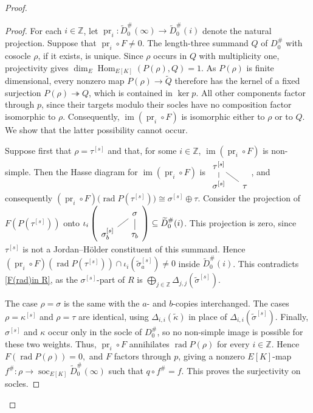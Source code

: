 \documentclass[a4paper,10pt,twoside]{amsart}
\theoremstyle{definition}
\numberwithin{equation}{section}
\begin{document}
\begin{proof}
\begin{proof}
For each \(i\in\mathbb Z\), let
\(
\operatorname{pr}_i:
\widetilde D_0^\#(\infty)\rightarrow
\widetilde D_0^\#(i)
\)
denote the natural projection. Suppose that
\(\operatorname{pr}_i\circ F\neq0\).
The length-three summand \(Q\) of \(D_0^\#\) with cosocle
\(\rho\), if it exists, is unique. Since \(\rho\) occurs
in \(Q\) with multiplicity one, projectivity gives
\(\dim_E\operatorname{Hom}_{E[K]}(P(\rho),Q)=1\).
As \(P(\rho)\) is finite dimensional, every nonzero map
\(P(\rho)\to\widetilde Q\) therefore has the kernel of a
fixed surjection \(P(\rho)\twoheadrightarrow Q\), which
is contained in \(\ker p\). All other components factor
through \(p\), since their targets modulo their socles
have no composition factor isomorphic to \(\rho\).
Consequently, \(\operatorname{im}(\operatorname{pr}_i\circ F)\)
is isomorphic either to \(\rho\) or to \(Q\).
We show that the latter possibility cannot occur.

Suppose first that \(\rho=\tau^{[s]}\) and that, for some \(i\in\mathbb Z\),
\(\operatorname{im}(\operatorname{pr}_i\circ F)\) is non-simple.
Then the Hasse diagram for $\operatorname{im}(\operatorname{pr}_i\circ F)$ is $\begin{tikzcd}[row sep=0.7em,column sep=1.2em]\tau^{[s]} & \\
\sigma^{[s]} & \tau
\arrow[no head, from=1-1, to=2-1]
\arrow[no head, from=1-1, to=2-2]
\end{tikzcd}$, and consequently $(\operatorname{pr}_i\circ F)
\bigl(\operatorname{rad}P(\tau^{[s]})\bigr)
\cong
\sigma^{[s]}\oplus\tau$. Consider the projection of \(F(P(\tau^{[s]}))\) onto $\iota_i\left(\begin{tikzcd}[row sep=0.7em,column sep=1.2em]
& \sigma \\
\sigma^{[s]}_b & \tau_b
\arrow[no head, from=1-2, to=2-1]
\arrow[no head, from=1-2, to=2-2]
\end{tikzcd}\right)\subseteq \widetilde D_0^\#(i)$. This projection is zero, since
\(\tau^{[s]}\) is not a Jordan--Hölder constituent of this summand. Hence $(\operatorname{pr}_i\circ F)(\operatorname{rad}P(\tau^{[s]}))\cap \iota_i(\widetilde\sigma_a^{[s]}) \neq 0$ inside $\widetilde D_0^\#(i)$. This contradicts \eqref{F(rad)in R}, as the
\(\sigma^{[s]}\)-part of \(R\) is
\(
\bigoplus_{j\in\mathbb Z}
\Delta_{j,j}(\widetilde\sigma^{[s]}).
\)

The case \(\rho=\sigma\) is the same with the \(a\)- and \(b\)-copies interchanged. The cases \(\rho=\kappa^{[s]}\) and \(\rho=\tau\) are identical, using \(\Delta_{i,i}(\widetilde\kappa)\) in place of \(\Delta_{i,i}(\widetilde\sigma^{[s]})\). Finally, \(\sigma^{[s]}\) and \(\kappa\) occur only in the socle of \(D_0^\#\), so no non-simple image is possible for these two weights. Thus, \(\operatorname{pr}_i\circ F\) annihilates \(\operatorname{rad}P(\rho)\) for every $i\in\mathbb Z$. Hence \( F(\operatorname{rad}P(\rho))=0, \) and \(F\) factors through \(p\), giving a nonzero \(E[K]\)-map \( f^\#:\rho\rightarrow \operatorname{soc}_{E[K]}\widetilde D_0^\#(\infty) \) such that \(q\circ f^\#=f\). This proves the surjectivity on socles.
\end{proof}




\end{proof}
\end{document}
